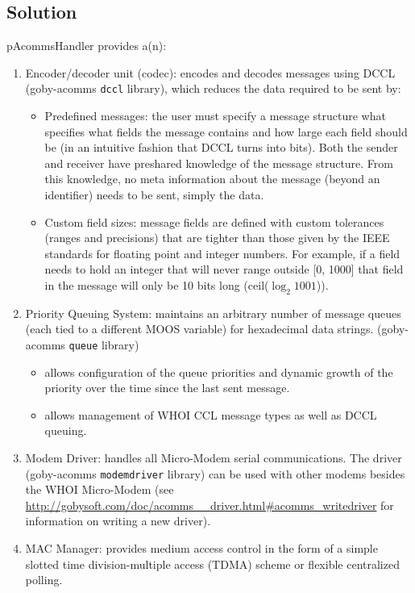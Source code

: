 \documentclass[11pt, letterpaper, oneside]{memoir}
\begin{document}
\subsection{Solution}
pAcommsHandler provides a(n):
\begin{enumerate}
\item Encoder/decoder unit (codec): encodes and decodes messages using DCCL (goby-acomms \verb|dccl| library), which reduces the data required to be sent by:
\begin{itemize}
\item Predefined messages: the user must specify a message structure what specifies what fields the message contains and how large each field should be (in an intuitive fashion that DCCL turns into bits). Both the sender and receiver have preshared knowledge of the message structure. From this knowledge, no meta information about the message (beyond an identifier) needs to be sent, simply the data. 
\item Custom field sizes: message fields are defined with custom tolerances (ranges and precisions) that are tighter than those given by the IEEE standards for floating point and integer numbers. For example, if a field needs to hold an integer that will never range outside [0, 1000] that field in the message will only be 10 bits long (ceil($\log_2{1001}$)).
\end{itemize}
\item Priority Queuing System: maintains an arbitrary number of message queues (each tied to a different MOOS variable) for hexadecimal data strings. (goby-acomms \verb|queue| library)
\begin{itemize} 
\item allows configuration of the queue priorities and dynamic growth of the priority over the time since the last sent message.
\item allows management of WHOI CCL message types as well as DCCL queuing. 
\end{itemize}
\item Modem Driver: handles all Micro-Modem serial communications. The driver (goby-acomms \verb|modemdriver| library) can be used with other modems besides the WHOI Micro-Modem (see \url{http://gobysoft.com/doc/acomms__driver.html#acomms_writedriver} for information on writing a new driver). 
\item MAC Manager: provides medium access control in the form of a simple slotted time division-multiple access (TDMA) scheme or flexible centralized polling.
\end{enumerate}
\end{document}
